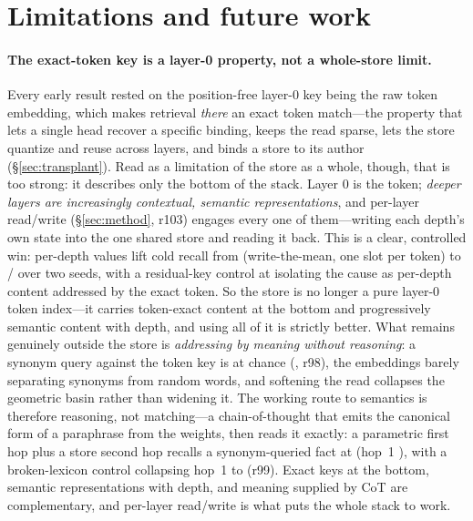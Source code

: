 \section{Limitations and future work}
\label{sec:limitations}

\paragraph{The exact-token key is a layer-0 property, not a whole-store limit.} Every
early result rested on the position-free layer-0 key being the raw token embedding, which
makes retrieval \emph{there} an exact token match---the property that lets a single head
recover a specific binding, keeps the read sparse, lets the store quantize and reuse across
layers, and binds a store to its author (\S\ref{sec:transplant}). Read as a limitation of
the store as a whole, though, that is too strong: it describes only the bottom of the
stack. Layer 0 is the token; \emph{deeper layers are increasingly contextual, semantic
representations}, and per-layer read/write (\S\ref{sec:method}, r103) engages every one of
them---writing each depth's own state into the one shared store and reading it back. This
is a clear, controlled win: per-depth values lift cold recall from 
(write-the-mean, one slot per token) to / over two seeds, with a
residual-key control at  isolating the cause as per-depth content addressed by
the exact token. So the store is no longer a pure layer-0 token index---it carries
token-exact content at the bottom and progressively semantic content with depth, and using
all of it is strictly better. What remains genuinely outside the store is
\emph{addressing by meaning without reasoning}: a synonym query against the token key is at
chance (, r98), the embeddings barely separating synonyms from random words, and
softening the read collapses the geometric basin rather than widening it. The working route
to semantics is therefore reasoning, not matching---a chain-of-thought that emits the
canonical form of a paraphrase from the weights, then reads it exactly: a parametric first
hop plus a store second hop recalls a synonym-queried fact at  (hop~1
), with a broken-lexicon control collapsing hop~1 to  (r99). Exact
keys at the bottom, semantic representations with depth, and meaning supplied by
CoT are complementary, and per-layer read/write is what puts the whole stack to work.

